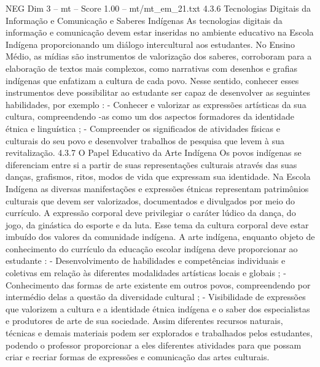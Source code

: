 \begin{textsample}{NEG Dim 3 – mt – Score 1.00 – mt/mt\_em\_21.txt}  \label{ex:f3_neg_214}
4.3.6 Tecnologias Digitais da Informação e Comunicação e Saberes Indígenas As tecnologias digitais da informação e comunicação devem estar inseridas no ambiente educativo na Escola Indígena proporcionando um diálogo intercultural aos estudantes.
No Ensino Médio, as mídias são instrumentos de valorização dos saberes, corroboram para a elaboração de textos mais complexos, como narrativas com desenhos e grafias indígenas que enfatizam a cultura de cada povo.
Nesse sentido, conhecer esses instrumentos deve possibilitar ao estudante ser capaz de desenvolver as seguintes habilidades, por exemplo : - Conhecer e valorizar as expressões artísticas da sua cultura, compreendendo -as como um dos aspectos formadores da identidade étnica e linguística ; - Compreender os significados de atividades físicas e culturais do seu povo e desenvolver trabalhos de pesquisa que levem à sua revitalização. 4.3.7 O Papel Educativo da Arte Indígena Os povos indígenas se diferenciam entre si a partir de suas representações culturais através das suas danças, grafismos, ritos, modos de vida que expressam sua identidade.
Na Escola Indígena as diversas manifestações e expressões étnicas representam patrimônios culturais que devem ser valorizados, documentados e divulgados por meio do currículo.
A expressão corporal deve privilegiar o caráter lúdico da dança, do jogo, da ginástica do esporte e da luta.
Esse tema da cultura corporal deve estar imbuído dos valores da comunidade indígena.
A arte indígena, enquanto objeto de conhecimento do currículo da educação escolar indígena deve proporcionar ao estudante : - Desenvolvimento de habilidades e competências individuais e coletivas em relação às diferentes modalidades artísticas locais e globais ; - Conhecimento das formas de arte existente em outros povos, compreendendo por intermédio delas a questão da diversidade cultural ; - Visibilidade de expressões que valorizem a cultura e a identidade étnica indígena e o saber dos especialistas e produtores de arte de sua sociedade.
Assim diferentes recursos naturais, técnicas e demais materiais podem ser explorados e trabalhados pelos estudantes, podendo o professor proporcionar a eles diferentes atividades para que possam criar e recriar formas de expressões e comunicação das artes culturais.

\end{textsample}
